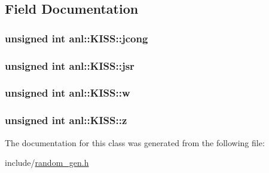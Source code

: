 \subsection{Field Documentation}
\hypertarget{classanl_1_1KISS_a3b6d6d43e69568d6c94f2c60ded0398a}{
\subsubsection[{jcong}]{\setlength{\rightskip}{0pt plus 5cm}unsigned int {\bf anl::KISS::jcong}}}
\label{classanl_1_1KISS_a3b6d6d43e69568d6c94f2c60ded0398a}
\hypertarget{classanl_1_1KISS_a24b0a5cd1dbc5da7d1f11ff1858d3fd3}{
\subsubsection[{jsr}]{\setlength{\rightskip}{0pt plus 5cm}unsigned int {\bf anl::KISS::jsr}}}
\label{classanl_1_1KISS_a24b0a5cd1dbc5da7d1f11ff1858d3fd3}
\hypertarget{classanl_1_1KISS_affa7ff0848714aaaa358f045e915e467}{
\subsubsection[{w}]{\setlength{\rightskip}{0pt plus 5cm}unsigned int {\bf anl::KISS::w}}}
\label{classanl_1_1KISS_affa7ff0848714aaaa358f045e915e467}
\hypertarget{classanl_1_1KISS_a8d6d53a11fa1eea98fa84780cf67e3a8}{
\subsubsection[{z}]{\setlength{\rightskip}{0pt plus 5cm}unsigned int {\bf anl::KISS::z}}}
\label{classanl_1_1KISS_a8d6d53a11fa1eea98fa84780cf67e3a8}


The documentation for this class was generated from the following file:\begin{DoxyCompactItemize}
\item 
include/\hyperlink{random__gen_8h}{random\_\-gen.h}\end{DoxyCompactItemize}
